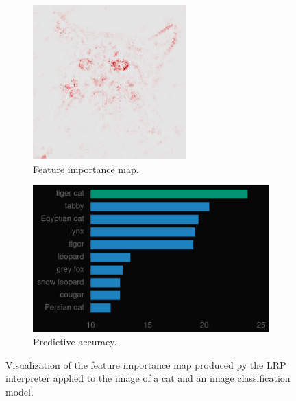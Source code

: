 \begin{figure}[ht]
\begin{subfigure}{0.48\linewidth}
      \includegraphics[width=\linewidth]{figures/lrp_cat_heatmap.png}
      \caption{Feature importance map.}
      \label{fig:lrp_cat_lrp}
    \end{subfigure}
    \begin{subfigure}{0.8\linewidth}
        \includegraphics[width=\linewidth]{figures/cat_classification.png}
        \caption{Predictive accuracy.}
        \label{fig:cat_classification}
    \end{subfigure}
    \caption{Visualization of the feature importance map produced py the LRP interpreter applied to the image of a cat and an image classification model.}\label{fig:lrp_cat}
    \vspace{-0.3cm}
\end{figure}

